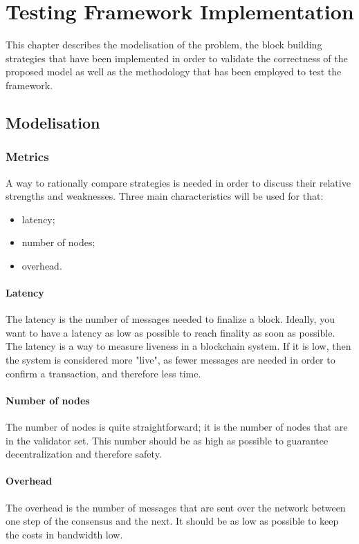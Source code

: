 \chapter{Testing Framework Implementation}
\label{chap:implementation}

This chapter describes the modelisation of the problem, the block building
strategies that have been implemented in order to validate the correctness of
the proposed model as well as the methodology that has been employed to test the
framework.

\section{Modelisation}
\subsection{Metrics}
\FloatBarrier
A way to rationally compare strategies is needed in order to discuss their
relative strengths and weaknesses. Three main characteristics will be used for
that:
\begin{itemize}
        \item latency;
        \item number of nodes;
        \item overhead.
\end{itemize}

\subsubsection{Latency}
The latency is the number of messages needed to finalize a block. Ideally, you
want to have a latency as low as possible to reach finality as soon as possible.
The latency is a way to measure liveness in a blockchain system. If it is low,
then the system is considered more "live", as fewer messages are needed in order
to confirm a transaction, and therefore less time.

\subsubsection{Number of nodes}
The number of nodes is quite straightforward; it is the number of nodes that are
in the validator set. This number should be as high as possible to guarantee
decentralization and therefore safety.

\subsubsection{Overhead}
The overhead is the number of messages that are sent over the network between
one step of the consensus and the next. It should be as low as possible to keep
the costs in bandwidth low.


